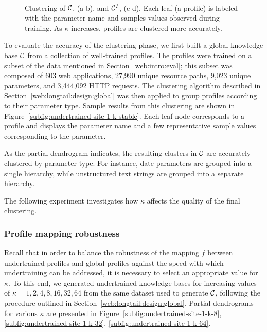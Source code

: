 \begin{figure}[p]
{    \label{subfig:undertrained-site-1-k-32}
  }\\
  \caption{Clustering of $\mathcal{C}$, (a-b), and $\mathcal{C}^I$, (c-d). Each leaf (a profile) is labeled with the parameter name and samples values observed during training. As $\kappa$ increases, profiles are clustered more accurately.}
  \label{fig:dendrograms}
  \vspace*{-.5cm}
\end{figure}

To evaluate the accuracy of the clustering phase, we first built a global knowledge base $\mathcal{C}$ from a collection of well-trained profiles.  The profiles were trained on a subset of the data mentioned in Section~\ref{web:intro:eval}; this subset was composed of 603 web applications, 27,990 unique resource paths, 9,023 unique parameters, and 3,444,092 \ac{HTTP} requests.  The clustering algorithm described in Section~\ref{web:longtail:design:global} was then applied to group profiles according to their parameter type.  Sample results from this clustering are shown in Figure~\ref{subfig:undertrained-site-1-k-stable}.  Each leaf node corresponds to a profile and displays the parameter name and a few representative sample values corresponding to the parameter.

As the partial dendrogram indicates, the resulting clusters in $\mathcal{C}$ are accurately clustered by parameter type.  For instance, date parameters are grouped into a single hierarchy, while unstructured text strings are grouped into a separate hierarchy.

The following experiment investigates how $\kappa$ affects the quality of the final clustering.

\subsubsection{Profile mapping robustness}
\label{web:longtail:eval:robustness}
Recall that in order to balance the robustness of the mapping $f$
between undertrained profiles and global profiles against the speed
with which undertraining can be addressed, it is necessary to select
an appropriate value for $\kappa$.  To this end, we generated
undertrained knowledge bases for increasing values of $\kappa=
1,2,4,8,16,32,64$ from the same dataset used to generate $\mathcal{C}$,
following the procedure outlined in
Section~\ref{web:longtail:design:global}.  Partial dendrograms for
various $\kappa$ are presented in
Figure~\ref{subfig:undertrained-site-1-k-8},
\ref{subfig:undertrained-site-1-k-32},
\ref{subfig:undertrained-site-1-k-64}.

